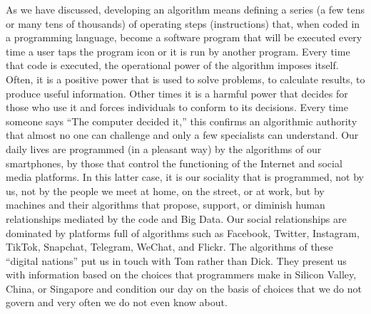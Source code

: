 As we have discussed, developing an algorithm means defining a series (a few tens or many tens of thousands) of operating steps (instructions) that, when coded in a programming language, become a software program that will be executed every time a user taps the program icon or it is run by another program. Every time that code is executed, the operational power of the algorithm imposes itself. Often, it is a positive power that is used to solve problems, to calculate results, to produce useful information. Other times it is a harmful power that decides for those who use it and forces individuals to conform to its decisions. Every time someone says ``The computer decided it,'' this confirms an algorithmic authority that almost no one can challenge and only a few specialists can understand. Our daily lives are programmed (in a pleasant way) by the algorithms of our smartphones, by those that control the functioning of the Internet and social media platforms. In this latter case, it is our sociality that is programmed, not by us, not by the people we meet at home, on the street, or at work, but by machines and their algorithms that propose, support, or diminish human relationships mediated by the code and Big Data. Our social relationships are dominated by platforms full of algorithms such as Facebook, Twitter, Instagram, TikTok, Snapchat, Telegram, WeChat, and Flickr. The algorithms of these ``digital nations'' put us in touch with Tom rather than Dick. They present us with information based on the choices that programmers make in Silicon Valley, China, or Singapore and condition our day on the basis of choices that we do not govern and very often we do not even know about.

